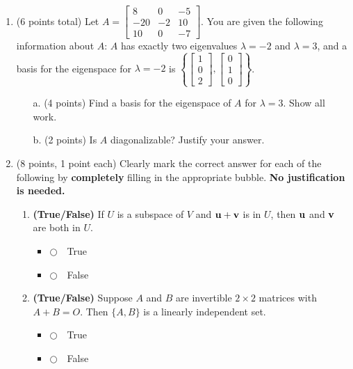 \documentclass[12pt]{extarticle}
\newcommand{\chooseone}{{\Large$\Circle$\ \ }}
\begin{document}
\begin{enumerate}
\item (6 points total) Let  $A=\left[\begin{array}{ccc}
8 & 0 & -5 
\\
 -20 & -2 & 10 
\\
 10 & 0 & -7 
\end{array}\right]$. You are given the following information about $A$: $A$ has exactly two eigenvalues $\lambda=-2$ and $\lambda=3$, and a basis for the eigenspace for $\lambda=-2$ is $\left\{\begin{bmatrix} 1 \\ 0 \\2\end{bmatrix},\begin{bmatrix} 0 \\ 1 \\0\end{bmatrix}\right\} $. 


\begin{itemize}
    \item[a.] (4 points) Find a basis for the eigenspace of $A$ for $\lambda=3$. Show all work.

    \vfill

    \item[b.] (2 points) Is $A$ diagonalizable? Justify your answer. 
    \vspace{1.5in}
\end{itemize}

\newpage




  \item (8 points, 1 point each)  Clearly mark the correct answer for each of the following by \textbf{completely} filling in the appropriate bubble.  \textbf{No justification is needed.}
\begin{enumerate}[label=\alph*.]
\item \textbf{(True/False)} If $U$ is a subspace of $V$ and ${\mathbf{u}}+{\mathbf{v}}$ is in $U$, then ${\mathbf{u}}$ and ${\mathbf{v}}$ are both in $U$.
\begin{itemize}[label={}]
\item \chooseone True
\item \chooseone False
\end{itemize}

\vspace{2cm}
\item \textbf{(True/False)} Suppose $A$ and $B$ are invertible $2\times 2$ matrices with $A+B=O$. Then $\{A,B\}$ is a linearly independent set. 
\begin{itemize}[label={}] 
\item \chooseone True
\item \chooseone False
\end{itemize}
\vspace{2cm}


\end{enumerate}
\end{enumerate}
\end{document}
